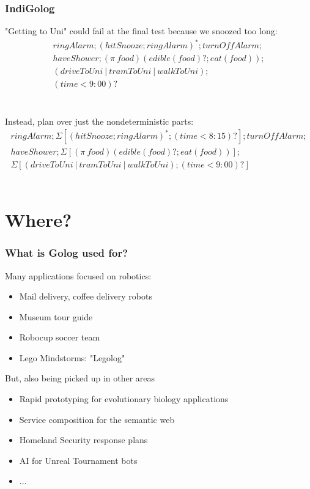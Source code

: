 \documentclass{beamer}
\begin{document}
\begin{frame}
\frametitle{IndiGolog}
"Getting to Uni" could fail at the final test because we snoozed too long:\[
\begin{array}{c}
ringAlarm;(hitSnooze; ringAlarm)^*;turnOffAlarm;\\
haveShower;(\pi\ food)(edible(food)?;eat(food));\\
(driveToUni\ |\ tramToUni\ |\ walkToUni);\\
(time<9:00)?
\end{array}\]\\
\ \\
Instead, plan over just the nondeterministic parts:\[
\begin{array}{c}
ringAlarm;\Sigma[(hitSnooze; ringAlarm)^*;(time<8:15)?];turnOffAlarm;\\
haveShower;\Sigma[(\pi\ food)(edible(food)?;eat(food))];\\
\Sigma[(driveToUni\ |\ tramToUni\ |\ walkToUni);(time<9:00)?]

\end{array}\]\\

\end{frame}

\section{Where?}
\begin{frame}
\frametitle{What is Golog used for?}
Many applications focused on robotics:
\begin{itemize}
  \item Mail delivery, coffee delivery robots
  \item Museum tour guide
  \item Robocup soccer team
  \item Lego Mindstorms: "Legolog"
\end{itemize}
\pause
But, also being picked up in other areas
\begin{itemize}
  \item Rapid prototyping for evolutionary biology applications
  \item Service composition for the semantic web
  \item Homeland Security response plans
  \item AI for Unreal Tournament bots
  \item ...
\end{itemize}
\end{frame}
\end{document}
